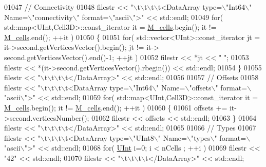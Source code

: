 \begin{DoxyCode}
01047     \textcolor{comment}{//  Connectivity}
01048     filestr << \textcolor{stringliteral}{"\(\backslash\)t\(\backslash\)t\(\backslash\)t\(\backslash\)t<DataArray type=\(\backslash\)"Int64\(\backslash\)" Name=\(\backslash\)"connectivity\(\backslash\)" format=\(\backslash\)"ascii\(\backslash\)">"} << std::endl;
01049     \textcolor{keywordflow}{for}( std::map<UInt,Cell3D>::const\_iterator it = \hyperlink{classFVCode3D_1_1Mesh3D_a8cac877e809226fb96078183efb25a2f}{M\_cells}.begin(); it != 
      \hyperlink{classFVCode3D_1_1Mesh3D_a8cac877e809226fb96078183efb25a2f}{M\_cells}.end(); ++it )
01050     \{
01051         \textcolor{keywordflow}{for}( std::vector<UInt>::const\_iterator jt = it->second.getVerticesVector().begin(); jt != it->
      second.getVerticesVector().end()-1; ++jt )
01052             filestr << *jt << \textcolor{stringliteral}{" "};
01053         filestr << *(it->second.getVerticesVector().rbegin()) << std::endl;
01054     \}
01055     filestr << \textcolor{stringliteral}{"\(\backslash\)t\(\backslash\)t\(\backslash\)t\(\backslash\)t</DataArray>"} << std::endl;
01056 
01057     \textcolor{comment}{//  Offsets}
01058     filestr << \textcolor{stringliteral}{"\(\backslash\)t\(\backslash\)t\(\backslash\)t\(\backslash\)t<DataArray type=\(\backslash\)"Int64\(\backslash\)" Name=\(\backslash\)"offsets\(\backslash\)" format=\(\backslash\)"ascii\(\backslash\)">"} << std::endl;
01059     \textcolor{keywordflow}{for}( std::map<UInt,Cell3D>::const\_iterator it = \hyperlink{classFVCode3D_1_1Mesh3D_a8cac877e809226fb96078183efb25a2f}{M\_cells}.begin(); it != 
      \hyperlink{classFVCode3D_1_1Mesh3D_a8cac877e809226fb96078183efb25a2f}{M\_cells}.end(); ++it )
01060     \{
01061         offsets += it->second.verticesNumber();
01062         filestr << offsets << std::endl;
01063     \}
01064     filestr << \textcolor{stringliteral}{"\(\backslash\)t\(\backslash\)t\(\backslash\)t\(\backslash\)t</DataArray>"} << std::endl;
01065 
01066     \textcolor{comment}{//  Types}
01067     filestr << \textcolor{stringliteral}{"\(\backslash\)t\(\backslash\)t\(\backslash\)t\(\backslash\)t<DataArray type=\(\backslash\)"UInt8\(\backslash\)" Name=\(\backslash\)"types\(\backslash\)" format=\(\backslash\)"ascii\(\backslash\)">"} << std::endl;
01068     \textcolor{keywordflow}{for}( \hyperlink{namespaceFVCode3D_a4bf7e328c75d0fd504050d040ebe9eda}{UInt} i=0; i < nCells ; ++i )
01069         filestr << \textcolor{stringliteral}{"42"} << std::endl;
01070     filestr << \textcolor{stringliteral}{"\(\backslash\)t\(\backslash\)t\(\backslash\)t\(\backslash\)t</DataArray>"} << std::endl;

\end{DoxyCode}
